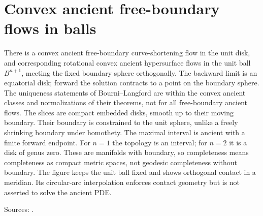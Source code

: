 \chapter{Convex ancient free-boundary flows in balls}\label{sec:catalogue-free-boundary-ancient-balls}
\begin{example}\label{ex:catalogue-free-boundary-ancient-balls}
There is a convex ancient free-boundary curve-shortening flow in the unit disk, and corresponding rotational convex ancient hypersurface flows in the unit ball $B^{n+1}$, meeting the fixed boundary sphere orthogonally. The backward limit is an equatorial disk; forward the solution contracts to a point on the boundary sphere. The uniqueness statements of Bourni--Langford are within the convex ancient classes and normalizations of their theorems, not for all free-boundary ancient flows.
The slices are compact embedded disks, smooth up to their moving boundary. Their boundary is constrained to the unit sphere, unlike a freely shrinking boundary under homothety. The maximal interval is ancient with a finite forward endpoint. For $n=1$ the topology is an interval; for $n=2$ it is a disk of genus zero. These are manifolds with boundary, so completeness means completeness as compact metric spaces, not geodesic completeness without boundary. The figure keeps the unit ball fixed and shows orthogonal contact in a meridian. Its circular-arc interpolation enforces contact geometry but is not asserted to solve the ancient PDE.
\par Sources: \cite{CatBourniLangford2023,CatBourniLangford2025}.
\end{example}

